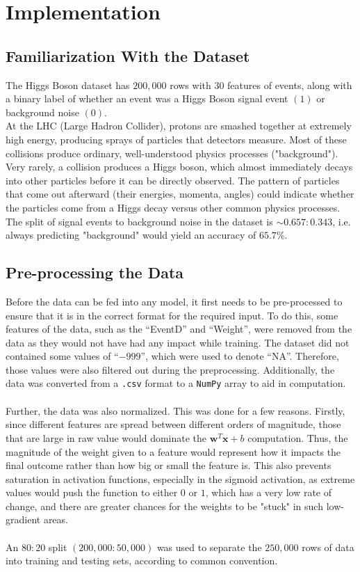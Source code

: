 \documentclass{article}
\begin{document}
\section{Implementation}

\subsection{Familiarization With the Dataset}
The Higgs Boson dataset has $200,000$ rows with $30$ features of events, along with a binary label of whether an event was a Higgs Boson signal event $(1)$ or background noise $(0)$.
\\
At the LHC (Large Hadron Collider), protons are smashed together at extremely high energy, producing sprays of particles that detectors measure. Most of these collisions produce ordinary, well-understood physics processes ("background"). Very rarely, a collision produces a Higgs boson, which almost immediately decays into other particles before it can be directly observed. The pattern of particles that come out afterward (their energies, momenta, angles) could indicate whether the particles come from a Higgs decay versus other common physics processes.
\\
The split of signal events to background noise in the dataset is $\sim 0.657: 0.343$, i.e. always predicting "background" would yield an accuracy of $65.7\%$.

\subsection{Pre-processing the Data}
Before the data can be fed into any model, it first needs to be pre-processed to ensure that it is in the correct format for the required input. To do this, some features of the data, such as the ``EventD'' and ``Weight'', were removed from the data as they would not have had any impact while training. The dataset did not contained some values of ``$-999$'', which were used to denote ``NA''. Therefore, those values were also filtered out during the preprocessing. Additionally, the data was converted from a \verb|.csv| format to a \verb|NumPy| array to aid in computation. 
\\\\
Further, the data was also normalized. This was done for a few reasons. Firstly, since different features are spread between different orders of magnitude, those that are large in raw value would dominate the $\mathbf{w}^T\mathbf{x} + b$ computation. Thus, the magnitude of the weight given to a feature would represent how it impacts the final outcome rather than how big or small the feature is. This also prevents saturation in activation functions, especially in the sigmoid activation, as extreme values would push the function to either $0$ or $1$, which has a very low rate of change, and there are greater chances for the weights to be "stuck" in such low-gradient areas.
\\\\
An $80:20$ split $(200,000:50,000)$ was used to separate the $250,000$ rows of data into training and testing sets, according to common convention.
\end{document}
